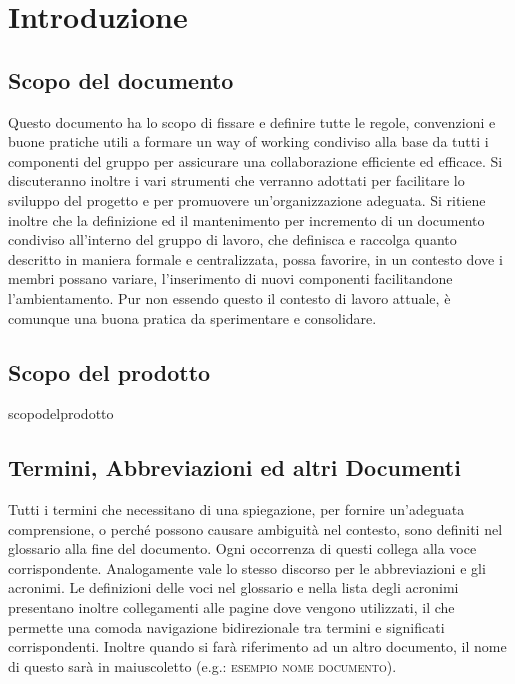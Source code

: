\section{Introduzione}
\subsection{Scopo del documento}
    Questo documento ha lo scopo di fissare e definire tutte le regole, convenzioni e buone pratiche utili a formare un way of working condiviso alla base da tutti i componenti del gruppo per assicurare una collaborazione efficiente ed efficace. Si discuteranno inoltre i vari strumenti che verranno adottati per facilitare lo sviluppo del progetto e per promuovere un'organizzazione adeguata.
    Si ritiene inoltre che la definizione ed il mantenimento per incremento di un documento condiviso all'interno del gruppo di lavoro, che definisca e raccolga quanto descritto in maniera formale e centralizzata, possa favorire, in un contesto dove i membri possano variare, l'inserimento di nuovi componenti facilitandone l'ambientamento. Pur non essendo questo il contesto di lavoro attuale, è comunque una buona pratica da sperimentare e consolidare.

\subsection{Scopo del prodotto}
    scopodelprodotto

\subsection{Termini, Abbreviazioni ed altri Documenti}
    Tutti i termini che necessitano di una spiegazione, per fornire un'adeguata comprensione, o perché possono causare ambiguità nel contesto, sono definiti nel glossario alla fine del documento. Ogni occorrenza di questi collega alla voce corrispondente. Analogamente vale lo stesso discorso per le abbreviazioni e gli acronimi. Le definizioni delle voci nel glossario e nella lista degli acronimi presentano inoltre collegamenti alle pagine dove vengono utilizzati, il che permette una comoda navigazione bidirezionale tra termini e significati corrispondenti.
    Inoltre quando si farà riferimento ad un altro documento, il nome di questo sarà in maiuscoletto (e.g.: \textsc{esempio nome documento}).

